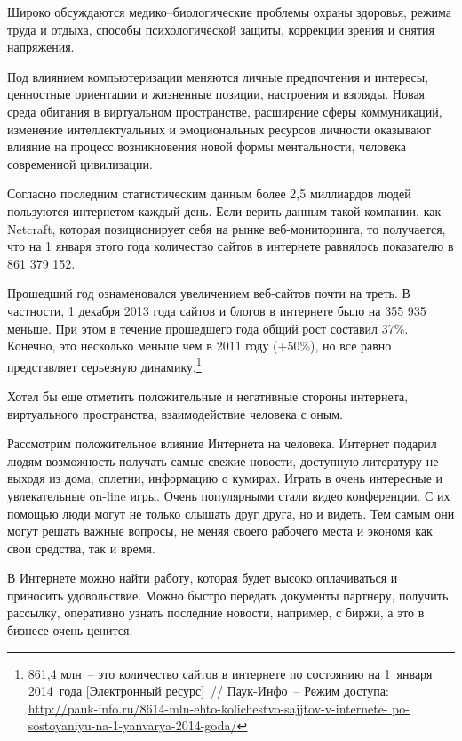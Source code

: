   Широко обсуждаются медико–биологические проблемы охраны здоровья, режима
  труда и отдыха, способы психологической защиты, коррекции зрения и снятия
  напряжения.
  
  Под влиянием компьютеризации меняются личные предпочтения и интересы,
  ценностные ориентации и жизненные позиции, настроения и взгляды. Новая среда
  обитания в виртуальном пространстве, расширение сферы коммуникаций, изменение
  интеллектуальных и эмоциональных ресурсов личности оказывают влияние на
  процесс возникновения новой формы ментальности, человека современной
  цивилизации.~\cite{libma}
  
  Согласно последним статистическим данным более 2,5 миллиардов людей
  пользуются интернетом каждый день. Если верить данным такой компании, как
  Netcraft, которая позиционирует себя на рынке веб-мониторинга, то получается,
  что на 1 января этого года количество сайтов в интернете равнялось показателю
  в 861 379 152.
  
  Прошедший год ознаменовался увеличением веб-сайтов почти на треть. В
  частности, 1 декабря 2013 года сайтов и блогов в интернете было на 355 935
  меньше. При этом в течение прошедшего года общий рост составил 37\%. Конечно,
  это несколько меньше чем в 2011 году (+50\%), но все равно представляет
  серьезную динамику.\footnote{
    861,4 млн~-- это количество сайтов в интернете по состоянию на 1~января
    2014~года [Электронный ресурс]~// Паук-Инфо~-- Режим доступа:\\
    \url{http://pauk-info.ru/8614-mln-ehto-kolichestvo-sajjtov-v-internete-
      po-sostoyaniyu-na-1-yanvarya-2014-goda/}}
  
  Хотел бы еще отметить положительные и негативные стороны интернета,
  виртуального пространства, взаимодействие человека с оным.
  
  Рассмотрим положительное влияние Интернета на человека. Интернет подарил
  людям возможность получать самые свежие новости, доступную литературу не
  выходя из дома, сплетни, информацию о кумирах. Играть в очень интересные и
  увлекательные on-line игры. Очень популярными стали видео конференции. С их
  помощью люди могут не только слышать друг друга, но и видеть. Тем самым они
  могут решать важные вопросы, не меняя своего рабочего места и экономя как
  свои средства, так и время.
  
  В Интернете можно найти работу, которая будет высоко оплачиваться и приносить
  удовольствие. Можно быстро передать документы партнеру, получить рассылку,
  оперативно узнать последние новости, например, с биржи, а это в бизнесе очень
  ценится.
          
